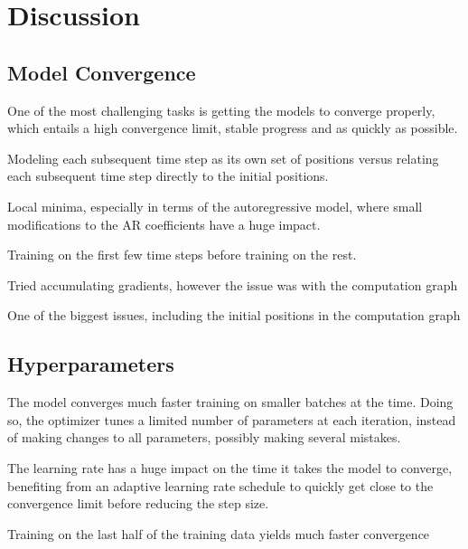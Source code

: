 \chapter{Discussion}\label{ch:Discussion}

\section{Model Convergence}

One of the most challenging tasks is getting the models to converge properly, which entails a high convergence limit, stable progress and as quickly as possible.

Modeling each subsequent time step as its own set of positions versus relating each subsequent time step directly to the initial positions.

Local minima, especially in terms of the autoregressive model, where small modifications to the AR coefficients have a huge impact.


Training on the first few time steps before training on the rest.


Tried accumulating gradients, however the issue was with the computation graph

One of the biggest issues, including the initial positions in the computation graph


\section{Hyperparameters}

The model converges much faster training on smaller batches at the time. Doing so, the optimizer tunes a limited number of parameters at each iteration, instead of making changes to all parameters, possibly making several mistakes.

The learning rate has a huge impact on the time it takes the model to converge, benefiting from an adaptive learning rate schedule to quickly get close to the convergence limit before reducing the step size.



Training on the last half of the training data yields much faster convergence